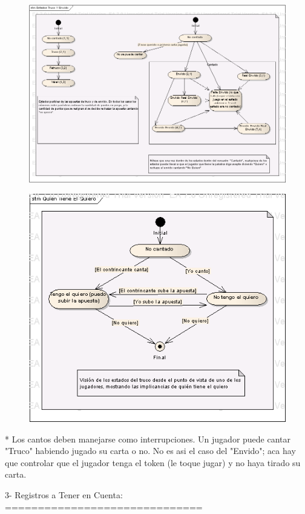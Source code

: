 \begin{figure}
\includegraphics{Estados Truco Y Envido.png}
\end{figure}
\begin{figure}
\includegraphics{Quien Tiene El Quiero.png}
\end{figure}

* Los cantos deben manejarse como interrupciones. Un jugador puede cantar "Truco" habiendo jugado su carta o no. No es asi el caso del "Envido"; aca hay que controlar que el jugador tenga el token (le toque jugar) y no haya tirado su carta.


3- Registros a Tener en Cuenta:
==============================

